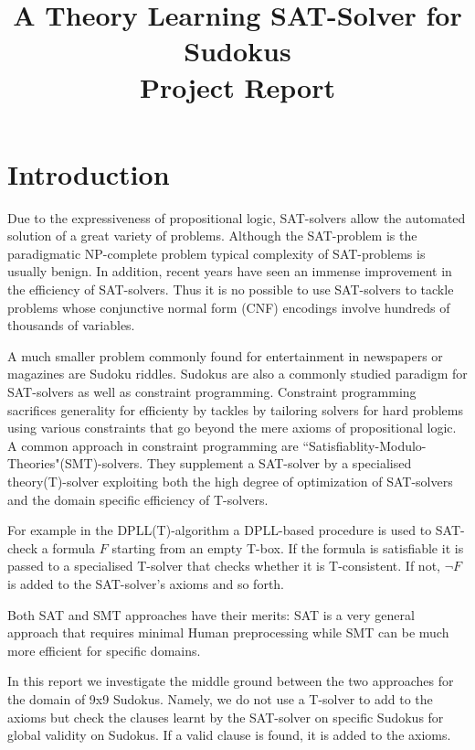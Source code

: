 \documentclass{article}
\begin{document}
\title{A Theory Learning SAT-Solver for Sudokus\\
	\large Project Report}
\maketitle


\section{Introduction}

Due to the expressiveness of propositional logic, SAT-solvers allow the automated solution of a great variety of problems. Although the SAT-problem is the paradigmatic NP-complete problem typical complexity of SAT-problems is usually benign. In addition, recent years have seen an immense improvement in the efficiency of SAT-solvers. Thus it is no possible to use SAT-solvers to tackle problems whose conjunctive normal form (CNF) encodings involve hundreds of thousands of variables.

A much smaller problem commonly found for entertainment in newspapers or magazines are Sudoku riddles. Sudokus are also a commonly studied paradigm for SAT-solvers as well as constraint programming. Constraint programming sacrifices generality for efficienty by tackles by tailoring solvers for hard problems using various constraints that go beyond the mere axioms of propositional logic. A common approach in constraint programming are ``Satisfiablity-Modulo-Theories"(SMT)-solvers. They supplement a SAT-solver by a specialised theory(T)-solver exploiting both the high degree of optimization of SAT-solvers and the domain specific efficiency of T-solvers.

For example in the DPLL(T)-algorithm a DPLL-based procedure is used to SAT-check a formula $F$ starting from an empty T-box. If the formula is satisfiable it is passed to a specialised T-solver that checks whether it is T-consistent. If not, $\neg F$ is added to the SAT-solver's axioms and so forth.

Both SAT and SMT approaches have their merits: SAT is a very general approach that requires minimal Human preprocessing while SMT can be much more efficient for specific domains.

In this report we investigate the middle ground between the two approaches for the domain of 9x9 Sudokus. Namely, we do not use a T-solver to add to the axioms but check the clauses learnt by the SAT-solver on specific Sudokus for global validity on Sudokus. If a valid clause is found, it is added to the axioms.
\end{document}
